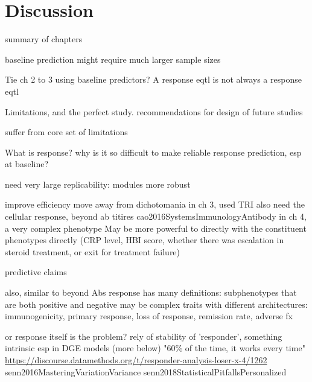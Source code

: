 %
%

\chapter{Discussion}

\begin{outline}

summary of chapters

    baseline prediction might require much larger sample sizes

    Tie ch 2 to 3 using baseline predictors?
    A response eqtl is not always a response eqtl

    Limitations, and the perfect study.
        recommendations for design of future studies

    suffer from core set of limitations 

What is response?
why is it so difficult to make reliable response prediction, esp at baseline?

    need very large 
        replicability: modules more robust


    improve efficiency
        move away from dichotomania
            in ch 3, used TRI
                also need the cellular response, beyond ab titires cao2016SystemsImmunologyAntibody
            in ch 4, 
                a very complex phenotype
                May be more powerful to directly with the constituent phenotypes directly (CRP level, HBI score, whether there was escalation in steroid treatment, or exit for treatment failure)

                predictive claims

                also, similar to beyond Abs
                response has many definitions: subphenotypes that are both positive and negative may be complex traits with different architectures: immunogenicity, primary response, loss of response, remission rate, adverse fx

    or response itself is the problem?
        rely of stability of 'responder', something intrinsic
            esp in DGE models (more below)
        "60\% of the time, it works every time"
            \url{https://discourse.datamethods.org/t/responder-analysis-loser-x-4/1262}
            senn2016MasteringVariationVariance
            senn2018StatisticalPitfallsPersonalized


\end{outline}
